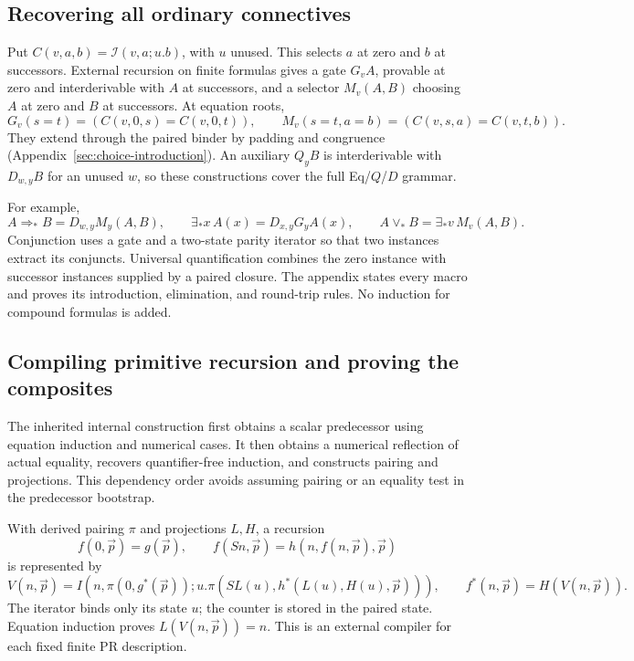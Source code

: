 \documentclass[11pt,a4paper]{article}
\theoremstyle{definition}
\begin{document}
\subsection{Recovering all ordinary connectives}

Put \(C(v,a,b)=\mathcal I(v,a;u.b)\), with \(u\) unused. This selects
\(a\) at zero and \(b\) at successors. External recursion on finite
formulas gives a gate \(G_vA\), provable at zero and interderivable
with \(A\) at successors, and a selector \(M_v(A,B)\) choosing \(A\)
at zero and \(B\) at successors. At equation roots,
\[
 G_v(s=t)=(C(v,0,s)=C(v,0,t)),\qquad
 M_v(s=t,a=b)=(C(v,s,a)=C(v,t,b)).
\]
They extend through the paired binder by padding and congruence
(Appendix~\ref{sec:choice-introduction}). An auxiliary \(Q_yB\)
is interderivable with \(D_{w,y}B\) for an unused \(w\), so these
constructions cover the full Eq/\(Q\)/\(D\) grammar.

For example,
\[
 A\Rightarrow_*B=D_{w,y}M_y(A,B),\qquad
 \exists_*x\,A(x)=D_{x,y}G_yA(x),\qquad
 A\vee_*B=\exists_*v\,M_v(A,B).
\]
Conjunction uses a gate and a two-state parity iterator so that two
instances extract its conjuncts. Universal quantification combines the
zero instance with successor instances supplied by a paired closure.
The appendix states every macro and proves its introduction,
elimination, and round-trip rules. No induction for compound formulas
is added.

\subsection{Compiling primitive recursion and proving the composites}

The inherited internal construction first obtains a scalar predecessor
using equation induction and numerical cases. It then obtains a
numerical reflection of actual equality, recovers quantifier-free
induction, and constructs pairing and projections. This dependency
order avoids assuming pairing or an equality test in the predecessor
bootstrap.

With derived pairing \(\pi\) and projections \(L,H\), a recursion
\[
 f(0,\vec p)=g(\vec p),\qquad
 f(Sn,\vec p)=h(n,f(n,\vec p),\vec p)
\]
is represented by
\[
 V(n,\vec p)=I\!\left(n,\pi(0,g^*(\vec p));
 u.\pi(SL(u),h^*(L(u),H(u),\vec p))\right),\qquad
 f^*(n,\vec p)=H(V(n,\vec p)).
\]
The iterator binds only its state \(u\); the counter is stored in the
paired state. Equation induction proves \(L(V(n,\vec p))=n\).
This is an external compiler for each fixed finite PR description.
\end{document}
